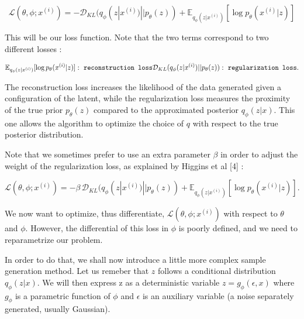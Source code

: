 \documentclass{article}
\begin{document}
\begin{equation}\label{loss1}
    \mathcal{L}(\theta, \phi ; x^{(i)}) = -\mathcal{D}_{KL}(q_\phi(z | x^{(i)}) || p_\theta(z)) + \mathbb{E}_{q_\phi(z | x^{(i)})} [\log p_\theta(x^{(i)} | z)]
\end{equation}


This will be our loss function. Note that the two terms correspond to two different losses :

\begin{equation*}
    \mathbb{E}_{q_\phi(z | x^{(i)})} [\log p_\theta(x^{(i)} | z)] :\ \texttt{reconstruction loss}\\
    \mathcal{D}_{KL}(q_\phi(z | x^{(i)}) || p_\theta(z)) :\ \texttt{regularization loss}.
\end{equation*}

The reconstruction loss increases the likelihood of the data generated given a configuration of the latent, while the regularization loss measures the proximity of the true prior $p_\theta (z)$ compared to the approximated posterior $q_\phi(z|x)$. This one allows the algorithm to optimize the choice of $q$ with respect to the true posterior distribution. 

Note that we sometimes prefer to use an extra parameter $\beta$ in order to adjust the weight of the regularization loss, as explained by Higgins et al [4] :

\begin{center}
    \begin{equation}\label{loss1beta}
        \mathcal{L}(\theta, \phi ; x^{(i)}) = - \beta \, \mathcal{D}_{KL}(q_\phi(z | x^{(i)}) || p_\theta(z)) + \mathbb{E}_{q_\phi(z | x^{(i)})} [\log p_\theta(x^{(i)} | z)].
    \end{equation}
\end{center}

We now want to optimize, thus differentiate, $\mathcal{L}(\theta, \phi; x^{(i)})$ with respect to $\theta$ and $\phi$. However, the differential of this loss in $\phi$ is poorly defined, and we need to reparametrize our problem.

In order to do that, we shall now introduce a little more complex sample generation method. Let us remeber that $z$ follows a conditional distribution $q_\phi (z | x)$. We will then express z as a deterministic variable $z=g_\phi (\epsilon, x)$ where $g_\phi$ is a parametric function of $\phi$ and $\epsilon$ is an auxiliary variable (a noise separately generated, usually Gaussian). 
\end{document}
